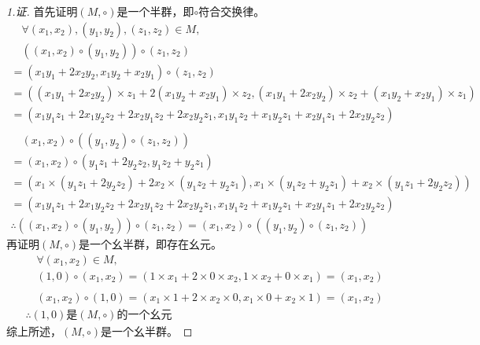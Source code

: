\documentclass[11pt]{article}
\begin{document}
\begin{proof}[1.证]
  首先证明$(M, \circ)$是一个半群，即$\circ$符合交换律。
  \begin{gather*}
    \quad \forall (x_1, x_2),(y_1, y_2),(z_1, z_2) \in M, \\
    \quad ((x_1, x_2) \circ (y_1, y_2)) \circ (z_1, z_2) \\
    = (x_1y_1 + 2x_2y_2, x_1y_2 + x_2y_1) \circ (z_1, z_2) \\
    = ((x_1y_1 + 2x_2y_2) \times z_1 + 2(x_1y_2 + x_2y_1) \times z_2, (x_1y_1 + 2x_2y_2) \times z_2 + (x_1y_2 + x_2y_1) \times z_1) \\
    = (x_1y_1z_1 + 2x_1y_2z_2 + 2x_2y_1z_2 + 2x_2y_2z_1, x_1y_1z_2 + x_1y_2z_1 + x_2y_1z_1 + 2x_2y_2z_2) \\
    \\
    \quad (x_1, x_2) \circ ((y_1, y_2) \circ (z_1, z_2)) \\
    = (x_1, x_2) \circ (y_1z_1 + 2y_2z_2, y_1z_2 + y_2z_1) \\
    = (x_1 \times (y_1z_1 + 2y_2z_2) + 2x_2 \times (y_1z_2 + y_2z_1), x_1 \times (y_1z_2 + y_2z_1) + x_2 \times (y_1z_1 + 2y_2z_2)) \\
    = (x_1y_1z_1 + 2x_1y_2z_2 + 2x_2y_1z_2 + 2x_2y_2z_1, x_1y_1z_2 + x_1y_2z_1 + x_2y_1z_1 + 2x_2y_2z_2) \\
    \therefore ((x_1, x_2) \circ (y_1, y_2)) \circ (z_1, z_2) = (x_1, x_2) \circ ((y_1, y_2) \circ (z_1, z_2))
  \end{gather*}
  \indent 再证明$(M, \circ)$是一个幺半群，即存在幺元。
  \begin{gather*}
    \quad \forall (x_1, x_2) \in M, \\
    \quad (1, 0) \circ (x_1, x_2)
    = (1 \times x_1 + 2 \times 0 \times x_2, 1 \times x_2 + 0 \times x_1)
    = (x_1, x_2) \\
    \\
    \quad (x_1, x_2) \circ (1, 0)
    = (x_1 \times 1 + 2 \times x_2 \times 0, x_1 \times 0 + x_2 \times 1)
    = (x_1, x_2) \\
    \therefore (1, 0) \text{是} (M, \circ) \text{的一个幺元}
  \end{gather*}
  \indent 综上所述，$(M, \circ)$是一个幺半群。
\end{proof}
\end{document}
